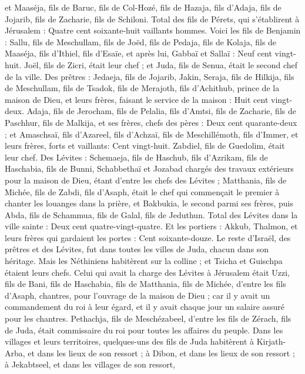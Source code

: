 \begin{multicols}{2}
et Maaséja, fils de Baruc, fils de Col-Hozé, fils de Hazaja, fils d'Adaja, fils de Jojarib, fils de Zacharie, fils de Schiloni.
Total des fils de Pérets, qui s'établirent à Jérusalem : Quatre cent soixante-huit vaillants hommes.
Voici les fils de Benjamin : Sallu, fils de Meschullam, fils de Joëd, fils de Pedaja, fils de Kolaja, fils de Maaséja, fils d'Ithiel, fils d'Esaïe,
et après lui, Gabbaï et Sallaï : Neuf cent vingt-huit.
Joël, fils de Zicri, était leur chef ; et Juda, fils de Senua, était le second chef de la ville.
Des prêtres : Jedaeja, fils de Jojarib, Jakin,
Seraja, fils de Hilkija, fils de Meschullam, fils de Tsadok, fils de Merajoth, fils d'Achithub, prince de la maison de Dieu,
et leurs frères, faisant le service de la maison : Huit cent vingt-deux. Adaja, fils de Jerocham, fils de Pelalia, fils d'Amtsi, fils de Zacharie, fils de Paschhur, fils de Malkija,
et ses frères, chefs des pères : Deux cent quarante-deux ; et Amaschsaï, fils d'Azareel, fils d'Achzaï, fils de Meschillémoth, fils d'Immer,
et leurs frères, forts et vaillants: Cent vingt-huit. Zabdiel, fils de Guedolim, était leur chef.
Des Lévites : Schemaeja, fils de Haschub, fils d'Azrikam, fils de Haschabia, fils de Bunni,
Schabbethaï et Jozabad chargés des travaux extérieurs pour la maison de Dieu, étant d'entre les chefs des Lévites ;
Matthania, fils de Michée, fils de Zabdi, fils d'Asaph, était le chef qui commençait le premier à chanter les louanges dans la prière, et Bakbukia, le second parmi ses frères, puis Abda, fils de Schammua, fils de Galal, fils de Jeduthun.
Total des Lévites dans la ville sainte : Deux cent quatre-vingt-quatre.
Et les portiers : Akkub, Thalmon, et leurs frères qui gardaient les portes : Cent soixante-douze.
Le reste d'Israël, des prêtres et des Lévites, fut dans toutes les villes de Juda, chacun dans son héritage.
Mais les Néthiniens habitèrent sur la colline ; et Tsicha et Guischpa étaient leurs chefs.
Celui qui avait la charge des Lévites à Jérusalem était Uzzi, fils de Bani, fils de Haschabia, fils de Matthania, fils de Michée, d'entre les fils d'Asaph, chantres, pour l'ouvrage de la maison de Dieu ;
car il y avait un commandement du roi à leur égard, et il y avait chaque jour un salaire assuré pour les chantres.
Pethachja, fils de Meschézabeel, d'entre les fils de Zérach, fils de Juda, était commissaire du roi pour toutes les affaires du peuple.
Dans les villages et leurs territoires, quelques-uns des fils de Juda habitèrent à Kirjath-Arba, et dans les lieux de son ressort ; à Dibon, et dans les lieux de son ressort ; à Jekabtseel, et dans les villages de son ressort,

\end{multicols}
